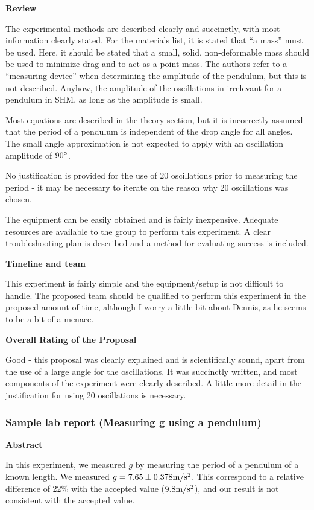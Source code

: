 \textbf{Review}

The experimental methods are described clearly and succinctly, with most information clearly stated. For the materials list, it is stated that ``a mass'' must be used. Here, it should be stated that a small, solid, non-deformable mass should be used to minimize drag and to act as a point mass. The authors refer to a ``measuring device'' when determining the amplitude of the pendulum, but this is not described. Anyhow, the amplitude of the oscillations in irrelevant for a pendulum in SHM, as long as the amplitude is small.

Most equations are described in the theory section, but it is incorrectly assumed that the period of a pendulum is independent of the drop angle for all angles. The small angle approximation is not expected to apply with an oscillation amplitude of $90\degree$.

No justification is provided for the use of 20 oscillations prior to measuring the period - it may be necessary to iterate on the reason why 20 oscillations was chosen.

The equipment can be easily obtained and is fairly inexpensive. Adequate resources are available to the group to perform this experiment. A clear troubleshooting plan is described and a method for evaluating success is included.

\textbf{Timeline and team}

This experiment is fairly simple and the equipment/setup is not difficult to handle. The proposed team should be qualified to perform this experiment in the proposed amount of time, although I worry a little bit about Dennis, as he seems to be a bit of a menace.

\textbf{Overall Rating of the Proposal}

Good - this proposal was clearly explained and is scientifically sound, apart from the use of a large angle for the oscillations. It was succinctly written, and most components of the experiment were clearly described. A little more detail in the justification for using 20 oscillations is necessary.

\subsubsection{Sample lab report (Measuring g using a pendulum)}

\textbf{Abstract}

In this experiment, we measured $g$ by measuring the period of a pendulum of a known length. We measured $g = 7.65\pm 0.378 {\rm m/s^2}$. This correspond to a relative difference of 22\% with the accepted value ($9.8 {\rm m/s^2}$), and our result is not consistent with the accepted value.

